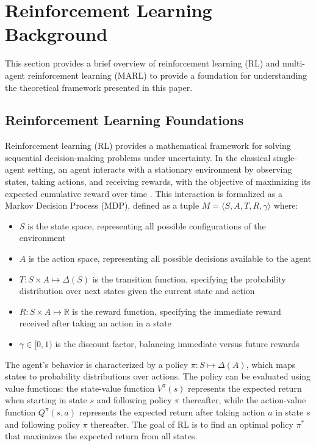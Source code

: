 \documentclass[a4paper,12pt]{report}
\begin{document}
\newpage
\appendix
{}
\setcounter{proposition}{0}
\setcounter{assumption}{0}
\setcounter{lemma}{0}
\setcounter{theorem}{0}

\chapter{Reinforcement Learning Background}

\label{appendix:rl_details}
This section provides a brief overview of reinforcement learning (RL) and multi-agent reinforcement learning (MARL) to provide a foundation for understanding the theoretical framework presented in this paper.

\section{Reinforcement Learning Foundations}

Reinforcement learning (RL) provides a mathematical framework for solving sequential decision-making problems under uncertainty. In the classical single-agent setting, an agent interacts with a stationary environment by observing states, taking actions, and receiving rewards, with the objective of maximizing its expected cumulative reward over time \cite{sutton2018reinforcement}. This interaction is formalized as a Markov Decision Process (MDP), defined as a tuple $M = \langle S, A, T, R, \gamma \rangle$ where:

\begin{itemize}
    \item $S$ is the state space, representing all possible configurations of the environment
    \item $A$ is the action space, representing all possible decisions available to the agent
    \item $T: S \times A \mapsto \Delta(S)$ is the transition function, specifying the probability distribution over next states given the current state and action
    \item $R: S \times A \mapsto \mathbb{R}$ is the reward function, specifying the immediate reward received after taking an action in a state
    \item $\gamma \in [0, 1)$ is the discount factor, balancing immediate versus future rewards
\end{itemize}

The agent's behavior is characterized by a policy $\pi: S \mapsto \Delta(A)$, which maps states to probability distributions over actions. The policy can be evaluated using value functions: the state-value function $V^\pi(s)$ represents the expected return when starting in state $s$ and following policy $\pi$ thereafter, while the action-value function $Q^\pi(s, a)$ represents the expected return after taking action $a$ in state $s$ and following policy $\pi$ thereafter. The goal of RL is to find an optimal policy $\pi^*$ that maximizes the expected return from all states.
\end{document}
